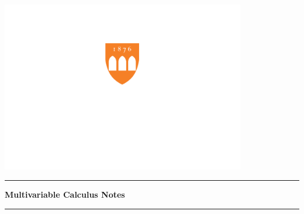 \documentclass[12pt, oneside]{book}
\newcounter{BoxCounter}
\begin{document}



\newcommand{\titlestandin}[0]{Multivariable Calculus Notes}
\newcommand{\cussubtitle}[0]{MATH 230}
\newcommand{\startdate}[0]{January 22, 2025}
\newcommand{\customenddate}[0]{May 13, 2025}
\newcommand{\professor}[0]{Prof. Lars Seme, M.S.}




\begin{titlepage}
    \begin{center}

        \vspace*{-2cm}
        \includegraphics[width=0.8\textwidth]{images/logo_white_text.png}\\ %
        \vfill

        \textcolor{horange}{\rule{\textwidth}{1.0pt}}

        \vspace{2em}

        {\huge \textbf{\titlestandin}}

        \vspace{1em} %

        \textcolor{horange}{\rule{\textwidth}{1.0pt}}


\end{center}
\end{titlepage}
\end{document}
